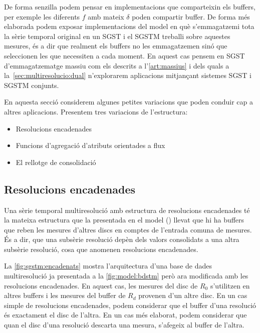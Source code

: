 
De forma senzilla podem pensar en implementacions que comparteixin els
buffers, per exemple les diferents $f$ amb mateix $\delta$ poden
compartir buffer. De forma més elaborada podem exposar implementacions
del model en què s'emmagatzemi tota la sèrie temporal original en un
\gls{SGST} i el \gls{SGSTM} treballi sobre aquestes mesures, és a dir
que realment els buffers no les emmagatzemen sinó que seleccionen les
que necessiten a cada moment. En aquest cas pensem en \gls{SGST}
d'emmagatzematge massiu com els descrits a l'\autoref{art:massius} i
dels quals a la~\autoref{sec:multiresolucio:dual} n'explorarem
aplicacions mitjançant sistemes \gls{SGST} i \gls{SGSTM} conjunts.



En aquesta secció considerem algunes petites variacions que poden
conduir cap a altres aplicacions.  Presentem tres variacions de
l'estructura:
\begin{itemize}
\item Resolucions encadenades

\item Funcions d'agregació d'atributs orientades a flux

\item El rellotge de consolidació
\end{itemize}









\subsection{Resolucions encadenades}


Una sèrie temporal multiresolució amb estructura de resolucions
encadenades té la mateixa estructura que la presentada en el model
() llevat que hi ha buffers que
reben les mesures d'altres discs en comptes de l'entrada comuna de
mesures.  És a dir, que una subsèrie resolució depèn dels valors
consolidats a una altra subsèrie resolució, cosa que anomenen
resolucions encadenades.


La \autoref{fig:sgstm:encadenats} mostra l'arquitectura d'una base de
dades multiresolució ja presentada a la \autoref{fig:model:bdstm} però
ara modificada amb les resolucions encadenades.  En aquest cas, les
mesures del disc de $R_0$ s'utilitzen en altres buffers i les mesures
del buffer de $R_d$ provenen d'un altre disc. En un cas simple de
resolucions encadenades, podem considerar que el buffer d'una
resolució és exactament el disc de l'altra. En un cas més elaborat,
podem considerar que quan el disc d'una resolució descarta una mesura,
s'afegeix al buffer de l'altra.


